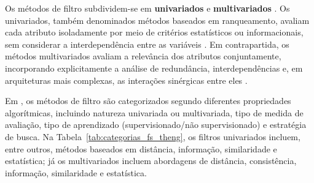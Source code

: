 Os métodos de filtro subdividem-se em \textbf{univariados} e \textbf{multivariados} \cite{SolorioFernandez2020,Theng2024}. Os univariados, também denominados métodos baseados em ranqueamento, avaliam cada atributo isoladamente por meio de critérios estatísticos ou informacionais, sem considerar a interdependência entre as variáveis \cite{SolorioFernandez2020,Theng2024,BARBIERI2024123667}. Em contrapartida, os métodos multivariados avaliam a relevância dos atributos conjuntamente, incorporando explicitamente a análise de redundância, interdependências e, em arquiteturas mais complexas, as interações sinérgicas entre eles \cite{Theng2024,SolorioFernandez2020,Dhal2022}.

Em , os métodos de filtro são categorizados segundo diferentes propriedades algorítmicas, incluindo natureza univariada ou multivariada, tipo de medida de avaliação, tipo de aprendizado (supervisionado/não supervisionado) e estratégia de busca. Na Tabela~\ref{tab:categorias_fs_theng}, os filtros univariados incluem, entre outros, métodos baseados em distância, informação, similaridade e estatística; já os multivariados incluem abordagens de distância, consistência, informação, similaridade e estatística.

